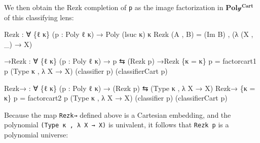 \documentclass[
  11pt,
  oneside,
  article]{memoir}
\newenvironment{Shaded}{}{}
\newcommand{\NormalTok}[1]{#1}
\newcommand{\OtherTok}[1]{\textcolor[rgb]{0.00,0.44,0.13}{#1}}
\theoremstyle{definition}
\theoremstyle{plain}
\newcommand{\yon}{\mathcal{y}}
\newcommand{\0}{\textsf{0}}
\newcommand{\1}{\tn{\textsf{1}}}
\begin{document}
We then obtain the Rezk completion of \texttt{p} as the image
factorization in \(\mathbf{Pol\yon^{Cart}}\) of this classifying lens:

\begin{Shaded}
\begin{Highlighting}[]
\NormalTok{Rezk }\OtherTok{:} \OtherTok{∀} \OtherTok{\{}\NormalTok{ℓ κ}\OtherTok{\}} \OtherTok{(}\NormalTok{p }\OtherTok{:}\NormalTok{ Poly ℓ κ}\OtherTok{)} \OtherTok{→}\NormalTok{ Poly }\OtherTok{(}\NormalTok{lsuc κ}\OtherTok{)}\NormalTok{ κ}
\NormalTok{Rezk }\OtherTok{(}\NormalTok{A , B}\OtherTok{)} \OtherTok{=} \OtherTok{(}\NormalTok{Im B}\OtherTok{)}\NormalTok{ , }\OtherTok{(λ} \OtherTok{(}\NormalTok{X , }\OtherTok{\_)} \OtherTok{→}\NormalTok{ X}\OtherTok{)}

\NormalTok{→Rezk }\OtherTok{:} \OtherTok{∀} \OtherTok{\{}\NormalTok{ℓ κ}\OtherTok{\}} \OtherTok{(}\NormalTok{p }\OtherTok{:}\NormalTok{ Poly ℓ κ}\OtherTok{)} \OtherTok{→}\NormalTok{ p ⇆ }\OtherTok{(}\NormalTok{Rezk p}\OtherTok{)}
\NormalTok{→Rezk }\OtherTok{\{}\NormalTok{κ }\OtherTok{=}\NormalTok{ κ}\OtherTok{\}}\NormalTok{ p }\OtherTok{=} 
\NormalTok{    factorcart1 p }\OtherTok{(}\NormalTok{Type κ , }\OtherTok{λ}\NormalTok{ X }\OtherTok{→}\NormalTok{ X}\OtherTok{)} 
                  \OtherTok{(}\NormalTok{classifier p}\OtherTok{)} 
                  \OtherTok{(}\NormalTok{classifierCart p}\OtherTok{)}

\NormalTok{Rezk→ }\OtherTok{:} \OtherTok{∀} \OtherTok{\{}\NormalTok{ℓ κ}\OtherTok{\}} \OtherTok{(}\NormalTok{p }\OtherTok{:}\NormalTok{ Poly ℓ κ}\OtherTok{)} \OtherTok{→} \OtherTok{(}\NormalTok{Rezk p}\OtherTok{)}\NormalTok{ ⇆ }\OtherTok{(}\NormalTok{Type κ , }\OtherTok{λ}\NormalTok{ X }\OtherTok{→}\NormalTok{ X}\OtherTok{)}
\NormalTok{Rezk→ }\OtherTok{\{}\NormalTok{κ }\OtherTok{=}\NormalTok{ κ}\OtherTok{\}}\NormalTok{ p }\OtherTok{=}
\NormalTok{    factorcart2 p }\OtherTok{(}\NormalTok{Type κ , }\OtherTok{λ}\NormalTok{ X }\OtherTok{→}\NormalTok{ X}\OtherTok{)} 
                  \OtherTok{(}\NormalTok{classifier p}\OtherTok{)} 
                  \OtherTok{(}\NormalTok{classifierCart p}\OtherTok{)}
\end{Highlighting}
\end{Shaded}

Because the map \texttt{Rezk→} defined above is a Cartesian embedding,
and the polynomial \texttt{(Type\ κ\ ,\ λ\ X\ →\ X)} is univalent, it
follows that \texttt{Rezk\ p} is a polynomial universe:
\end{document}
